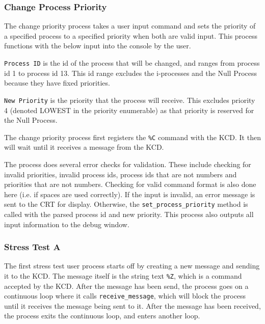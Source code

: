 \documentclass[se]{uw-wkrpt}
\begin{document}
\subsubsection{Change Process Priority}

The change priority process takes a user input command and sets the priority of a specified process to a specified priority when both are valid input. This process functions with the below input into the console by the user.

\begin{code}
\end{code}

\texttt{Process ID} is the id of the process that will be changed, and ranges from process id 1 to process id 13. This id range excludes the i-processes and the Null Process because they have fixed priorities.

\texttt{New Priority} is the priority that the process will receive. This excludes priority 4 (denoted LOWEST in the priority enumerable) as that priority is reserved for the Null Process.

The change priority process first registers the \texttt{\%C} command with the KCD. It then will wait until it receives a message from the KCD.

The process does several error checks for validation. These include checking for invalid priorities, invalid process ids, process ids that are not numbers and priorities that are not numbers. Checking for valid command format is also done here (i.e. if spaces are used correctly). If the input is invalid, an error message is sent to the CRT for display. Otherwise, the \texttt{set\_process\_priority} method is called with the parsed process id and new priority. This process also outputs all input information to the debug window.

\subsubsection{Stress Test A}

The first stress test user process starts off by creating a new message and sending it to the KCD. The message itself is the string text \texttt{\%Z}, which is a command accepted by the KCD. After the message has been send, the process goes on a continuous loop where it calls \texttt{receive\_message}, which will block the process until it receives the message being sent to it. After the message has been received, the process exits the continuous loop, and enters another loop.
\end{document}
